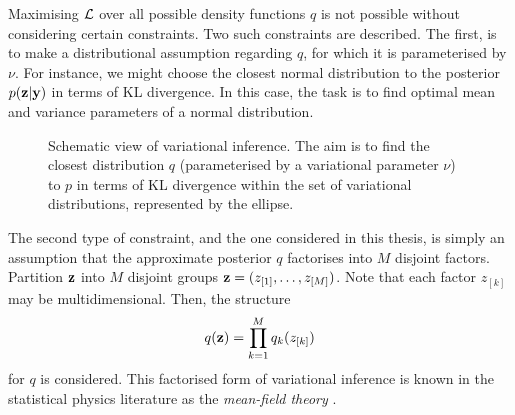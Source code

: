 Maximising ${\mathcal L}$ over all possible density functions $q$ is not possible without considering certain constraints.
Two such constraints are described. 
The first, is to make a distributional assumption regarding $q$, for which it is parameterised by $\nu$.
For instance, we might choose the closest normal distribution to the posterior $p({\mathbf z}|{\mathbf y})$ in terms of KL divergence.
In this case, the task is to find optimal mean and variance parameters of a normal distribution.

\begin{figure}[htb]
  \centering
  \vspace{-1em}
  \caption[Schematic view of variational inference. The aim is to find the closest distribution $q$ (parameterised by a variational parameter $\nu$) to $p$ in terms of KL divergence within the set of variational distributions, represented by the ellipse.]{Schematic view of variational inference\footnotemark. The aim is to find the closest distribution $q$ (parameterised by a variational parameter $\nu$) to $p$ in terms of KL divergence within the set of variational distributions, represented by the ellipse.}
\end{figure}

The second type of constraint, and the one considered in this thesis, is simply an assumption that the approximate posterior $q$ factorises into $M$ disjoint factors.
Partition ${\mathbf z}$ into $M$ disjoint groups ${\mathbf z} = (z_{[1]},\dots,z_{[M]})$.
Note that each factor $z_{[k]}$ may be multidimensional.
Then, the structure
\[
  q({\mathbf z}) = \prod_{k=1}^M q_k(z_{[k]})
\]
for $q$ is considered.
This factorised form of variational inference is known in the statistical physics literature as the \emph{mean-field theory} \citep{itzykson1991statistical}.

